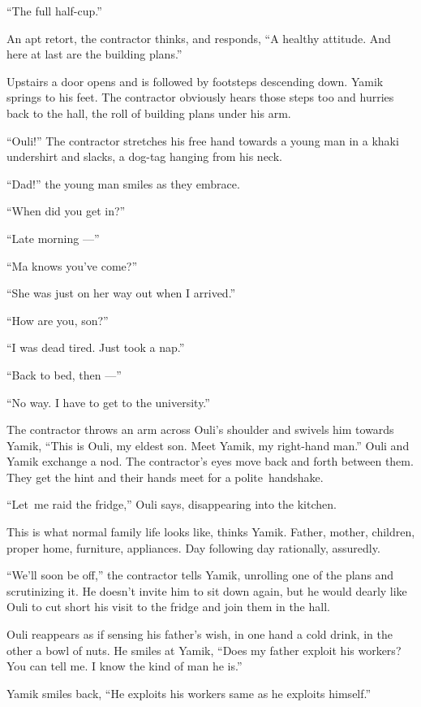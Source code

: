 \documentclass[twoside,11pt]{book}
\begin{document}
``The full half-cup.''

An apt retort, the contractor thinks, and responds, ``A healthy attitude. And here at last are the
building plans.''

Upstairs a door opens and is followed by footsteps descending down. Yamik springs to his feet. The contractor obviously
hears those steps too and hurries back to the hall, the roll of building plans under his arm.

``Ouli!''  The contractor stretches his free hand towards a young man in a khaki undershirt
and slacks,{ }a dog-tag hanging from his neck.

``Dad!'' the young man smiles as they embrace.

``When did you get in?''

``Late morning ---''

``Ma knows you've come?''

``She was just on her way out when I arrived.''

``How are you, son?''

``I was dead tired. Just took a nap.''

``Back to bed, then ---''

``No way. I have to get to the university.''

The contractor throws an arm across Ouli's shoulder and swivels him towards Yamik, ``This is Ouli, my
eldest son. Meet Yamik, my right-hand man.'' Ouli and Yamik exchange a nod. The contractor's eyes move
back and forth between them. They get the hint and their hands meet for a polite~handshake.

``Let~me raid the fridge,'' Ouli says, disappearing into the kitchen.

This is what normal family life looks like, thinks Yamik. Father, mother, children, proper home, furniture, appliances.
Day following day rationally, assuredly.

``We'll soon be off,'' the contractor tells Yamik, unrolling one of the plans and scrutinizing
it. He doesn't invite him to sit down again, but he would dearly like Ouli to cut short his visit to the fridge and
join them in the hall.

Ouli reappears as if sensing his father's wish, in one hand a cold drink, in the other a bowl of nuts. He smiles at
Yamik, ``Does my father exploit his workers? You can tell me. I know the kind of man he
is.''

Yamik smiles back, ``He exploits his workers same as he exploits himself.''
\end{document}
